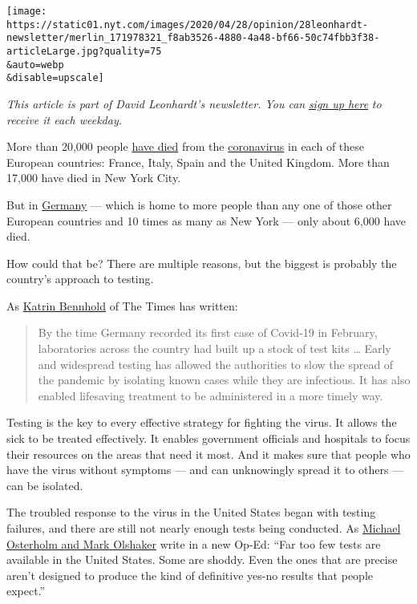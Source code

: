 \texttt{[image: https://static01.nyt.com/images/2020/04/28/opinion/28leonhardt-newsletter/merlin\_171978321\_f8ab3526-4880-4a48-bf66-50c74fbb3f38-articleLarge.jpg?quality=75\\\&auto=webp\\\&disable=upscale]}

\emph{This article is part of David Leonhardt's newsletter. You can}
\href{https://www.nytimes.com/newsletters/opiniontoday?action=click\&module=Intentional\&pgtype=Article}{\emph{sign
up here}} \emph{to receive it each weekday.}

More than 20,000 people \href{https://coronavirus.jhu.edu/map.html}{have
died} from the
\href{https://www.nytimes.com/2020/05/06/world/europe/germany-merkel-coronavirus-reopening.html}{coronavirus}
in each of these European countries: France, Italy, Spain and the United
Kingdom. More than 17,000 have died in New York City.

But in
\href{https://www.nytimes.com/2020/05/06/world/europe/germany-merkel-coronavirus-reopening.html}{Germany}
--- which is home to more people than any one of those other European
countries and 10 times as many as New York --- only about 6,000 have
died.

How could that be? There are multiple reasons, but the biggest is
probably the country's approach to testing.

As
\href{https://www.nytimes.com/2020/04/04/world/europe/germany-coronavirus-death-rate.html}{Katrin
Bennhold} of The Times has written:

\begin{quote}
By the time Germany recorded its first case of Covid-19 in February,
laboratories across the country had built up a stock of test kits
\ldots{} Early and widespread testing has allowed the authorities to
slow the spread of the pandemic by isolating known cases while they are
infectious. It has also enabled lifesaving treatment to be administered
in a more timely way.
\end{quote}

Testing is the key to every effective strategy for fighting the virus.
It allows the sick to be treated effectively. It enables government
officials and hospitals to focus their resources on the areas that need
it most. And it makes sure that people who have the virus without
symptoms --- and can unknowingly spread it to others --- can be
isolated.

The troubled response to the virus in the United States began with
testing failures, and there are still not nearly enough tests being
conducted. As
\href{https://www.nytimes.com/2020/04/28/opinion/coronavirus-testing.html}{Michael
Osterholm and Mark Olshaker} write in a new Op-Ed: ``Far too few tests
are available in the United States. Some are shoddy. Even the ones that
are precise aren't designed to produce the kind of definitive yes-no
results that people expect.''

